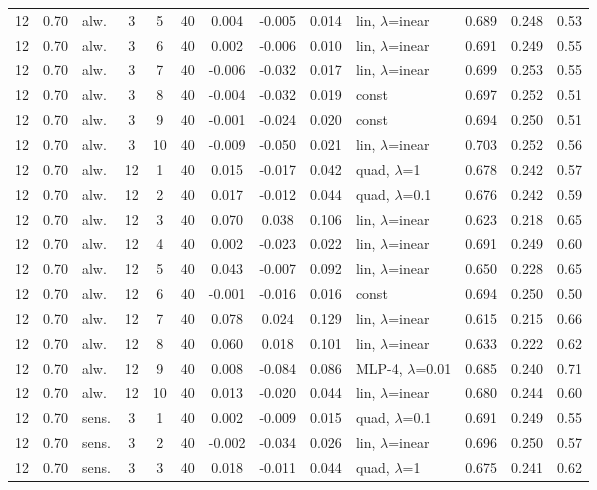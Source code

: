 \documentclass[10pt]{article}
\begin{document}
\begin{scriptsize}
\begin{longtable}{cclcc c ccc l ccc}
12 & 0.70 & alw. & 3 & 5 & 40 & 0.004 & -0.005 & 0.014 & lin, $\lambda$=inear & 0.689 & 0.248 & 0.53 \\
12 & 0.70 & alw. & 3 & 6 & 40 & 0.002 & -0.006 & 0.010 & lin, $\lambda$=inear & 0.691 & 0.249 & 0.55 \\
12 & 0.70 & alw. & 3 & 7 & 40 & -0.006 & -0.032 & 0.017 & lin, $\lambda$=inear & 0.699 & 0.253 & 0.55 \\
12 & 0.70 & alw. & 3 & 8 & 40 & -0.004 & -0.032 & 0.019 & const & 0.697 & 0.252 & 0.51 \\
12 & 0.70 & alw. & 3 & 9 & 40 & -0.001 & -0.024 & 0.020 & const & 0.694 & 0.250 & 0.51 \\
12 & 0.70 & alw. & 3 & 10 & 40 & -0.009 & -0.050 & 0.021 & lin, $\lambda$=inear & 0.703 & 0.252 & 0.56 \\
12 & 0.70 & alw. & 12 & 1 & 40 & 0.015 & -0.017 & 0.042 & quad, $\lambda$=1 & 0.678 & 0.242 & 0.57 \\
12 & 0.70 & alw. & 12 & 2 & 40 & 0.017 & -0.012 & 0.044 & quad, $\lambda$=0.1 & 0.676 & 0.242 & 0.59 \\
12 & 0.70 & alw. & 12 & 3 & 40 & 0.070 & 0.038 & 0.106 & lin, $\lambda$=inear & 0.623 & 0.218 & 0.65 \\
12 & 0.70 & alw. & 12 & 4 & 40 & 0.002 & -0.023 & 0.022 & lin, $\lambda$=inear & 0.691 & 0.249 & 0.60 \\
12 & 0.70 & alw. & 12 & 5 & 40 & 0.043 & -0.007 & 0.092 & lin, $\lambda$=inear & 0.650 & 0.228 & 0.65 \\
12 & 0.70 & alw. & 12 & 6 & 40 & -0.001 & -0.016 & 0.016 & const & 0.694 & 0.250 & 0.50 \\
12 & 0.70 & alw. & 12 & 7 & 40 & 0.078 & 0.024 & 0.129 & lin, $\lambda$=inear & 0.615 & 0.215 & 0.66 \\
12 & 0.70 & alw. & 12 & 8 & 40 & 0.060 & 0.018 & 0.101 & lin, $\lambda$=inear & 0.633 & 0.222 & 0.62 \\
12 & 0.70 & alw. & 12 & 9 & 40 & 0.008 & -0.084 & 0.086 & MLP-4, $\lambda$=0.01 & 0.685 & 0.240 & 0.71 \\
12 & 0.70 & alw. & 12 & 10 & 40 & 0.013 & -0.020 & 0.044 & lin, $\lambda$=inear & 0.680 & 0.244 & 0.60 \\
12 & 0.70 & sens. & 3 & 1 & 40 & 0.002 & -0.009 & 0.015 & quad, $\lambda$=0.1 & 0.691 & 0.249 & 0.55 \\
12 & 0.70 & sens. & 3 & 2 & 40 & -0.002 & -0.034 & 0.026 & lin, $\lambda$=inear & 0.696 & 0.250 & 0.57 \\
12 & 0.70 & sens. & 3 & 3 & 40 & 0.018 & -0.011 & 0.044 & quad, $\lambda$=1 & 0.675 & 0.241 & 0.62 \\

\end{longtable}
\end{scriptsize}
\end{document}
